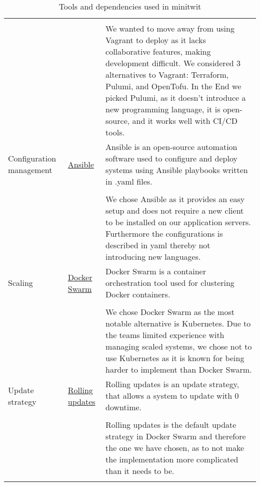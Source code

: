 \begin{longtable}{|p{}|p{} | p{}|}
    &&\\
    &&  We wanted to move away from using Vagrant to deploy as it lacks collaborative features, making development difficult. We considered 3 alternatives to Vagrant: Terraform, Pulumi, and OpenTofu. In the End we picked Pulumi, as it doesn't introduce a new programming language, it is open-source, and it works well with CI/CD tools.\\
    \hline
    Configuration management & \href{https://docs.ansible.com/}{Ansible} & Ansible is an open-source automation software used to configure and deploy systems using Ansible playbooks written in .yaml files.\\
    &&\\
    && We chose Ansible as it provides an easy setup and does not require a new client to be installed on our application servers. Furthermore the configurations is described in yaml thereby not introducing new languages.\\
    \hline
    Scaling & \href{https://docs.docker.com/reference/cli/docker/swarm/}{Docker Swarm} & Docker Swarm is a container orchestration tool used for clustering Docker containers.\\
    &&\\
    && We chose Docker Swarm as the most notable alternative is Kubernetes. Due to the teams limited experience with managing scaled systems, we chose not to use Kubernetes as it is known for being harder to implement than Docker Swarm.\\
    \hline
    Update strategy & \href{https://docs.docker.com/engine/swarm/swarm-tutorial/rolling-upate/}{Rolling updates} & Rolling updates is an update strategy, that allows a system to update with 0 downtime.\\
    &&\\
    && Rolling updates is the default update strategy in Docker Swarm and therefore the one we have chosen, as to not make the implementation more complicated than it needs to be.\\
    \hline
    \caption{Tools and dependencies used in minitwit}
\end{longtable}
